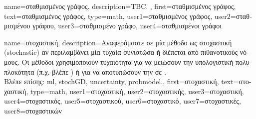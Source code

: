 {name={\foreignlanguage{greek}{σταθμισμένος γράφος}},
	description={TBC. },
	first={\foreignlanguage{greek}{σταθμισμένος γράφος}},
	text={\foreignlanguage{greek}{σταθμισμένος γράφος}},
	type=math,
	user1={\foreignlanguage{greek}{σταθμισμένος γράφος}}, %
  	user2={\foreignlanguage{greek}{σταθμισμένου γράφου}}, %
	user3={\foreignlanguage{greek}{σταθμισμένο γράφο}}, %
	user4={\foreignlanguage{greek}{σταθμισμένοι γράφοι}} %
}

{name={\foreignlanguage{greek}{στοχαστική}},
	description={\foreignlanguage{greek}{Αναφερόμαστε σε μία μέθοδο ως στοχαστική} 
		(stochastic) \foreignlanguage{greek}{αν περιλαμβάνει μία τυχαία συνιστώσα ή διέπεται από πιθανοτικούς 
		νόμους. Οι μέθοδοι}  \foreignlanguage{greek}{χρησιμοποιούν τυχαιότητα για να 
		μειώσουν την υπολογιστική πολυπλοκότητα (π.χ. βλέπε} ) 
		\foreignlanguage{greek}{ή για να αποτυπώσουν την}  
		\foreignlanguage{greek}{σε} . 
		\\
		\foreignlanguage{greek}{Βλέπε επίσης:} \gls{ml}, \gls{stochGD}, \gls{uncertainty}, \gls{probmodel}.},
	first={\foreignlanguage{greek}{στοχαστική}},
	text={\foreignlanguage{greek}{στοχαστική}}, 
	type=math,
	user1={\foreignlanguage{greek}{στοχαστική}}, %
	user2={\foreignlanguage{greek}{στοχαστικής}}, %
	user3={\foreignlanguage{greek}{στοχαστική}}, %
	user4={\foreignlanguage{greek}{στοχαστικός}}, %
	user5={\foreignlanguage{greek}{στοχαστικού}}, %
	user6={\foreignlanguage{greek}{στοχαστικό}}, %
	user7={\foreignlanguage{greek}{στοχαστικές}}, %
	user8={\foreignlanguage{greek}{στοχαστικών}} %
}


